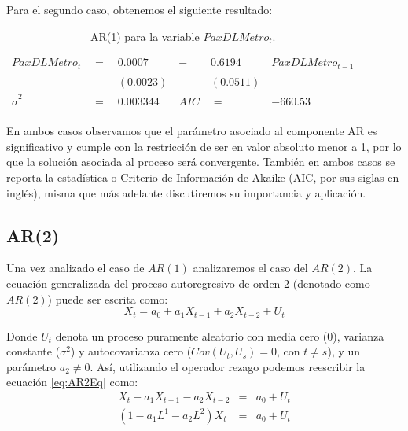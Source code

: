 \documentclass[
]{book}
\begin{document}
Para el segundo caso, obtenemos el siguiente resultado:

\begin{longtable}[]{@{}
  >{\centering\arraybackslash}p{}
  >{\centering\arraybackslash}p{}
  >{\centering\arraybackslash}p{}
  >{\centering\arraybackslash}p{}
  >{\centering\arraybackslash}p{}
  >{\centering\arraybackslash}p{}@{}}
\caption{\label{tab:AR0101} AR(1) para la variable \(PaxDLMetro_t\).}\tabularnewline
\toprule\noalign{}
\endfirsthead
\endhead
\bottomrule\noalign{}
\endlastfoot
\(PaxDLMetro_t\) & \(=\) & \(0.0007\) & \(-\) & \(0.6194\) & \(PaxDLMetro_{t-1}\) \\
& & \((0.0023)\) & & \((0.0511)\) & \\
\(\hat{\sigma}^2\) & \(=\) & \(0.003344\) & \(AIC\) & \(=\) & \(-660.53\) \\
\end{longtable}

En ambos casos observamos que el parámetro asociado al componente AR es significativo y cumple con la restricción de ser en valor absoluto menor a 1, por lo que la solución asociada al proceso será convergente. También en ambos casos se reporta la estadística o Criterio de Información de Akaike (AIC, por sus siglas en inglés), misma que más adelante discutiremos su importancia y aplicación.

\hypertarget{ar2}{%
\subsection{AR(2)}\label{ar2}}

Una vez analizado el caso de \(AR(1)\) analizaremos el caso del \(AR(2)\). La ecuación generalizada del proceso autoregresivo de orden 2 (denotado como \(AR(2)\)) puede ser escrita como:
\begin{equation}
    X_t = a_0 + a_1 X_{t-1} + a_2 X_{t-2} + U_t
    \label{eq:AR2Eq}
\end{equation}

Donde \(U_t\) denota un proceso puramente aleatorio con media cero (\(0\)), varianza constante (\(\sigma^2\)) y autocovarianza cero (\(Cov(U_t, U_s) = 0\), con \(t \neq s\)), y un parámetro \(a_2 \neq 0\). Así, utilizando el operador rezago podemos reescribir la ecuación
\eqref{eq:AR2Eq} como:
\begin{eqnarray*}     
    X_t - a_1 X_{t-1} - a_2 X_{t-2} & = & a_0 + U_t \\
    (1 - a_1 L^1 - a_2 L^2) X_t & = & a_0 + U_t
\end{eqnarray*}
\end{document}
